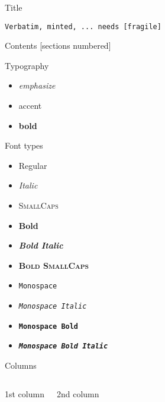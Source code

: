 
\begin{frame}[fragile]{Title}
    \begin{verbatim}Verbatim, minted, ... needs [fragile]\end{verbatim}
\end{frame}

\begin{frame}{Contents}
    [sections numbered]
    \tableofcontents[hideallsubsections]
\end{frame}

\begin{frame}{Typography}
    \begin{itemize}
        \item \emph{emphasize}
        \item \alert{accent}
        \item \textbf{bold}
    \end{itemize}
\end{frame}

\begin{frame}{Font types}
    \begin{itemize}
        \item Regular
        \item \textit{Italic}
        \item \textsc{SmallCaps}
        \item \textbf{Bold}
        \item \textbf{\textit{Bold Italic}}
        \item \textbf{\textsc{Bold SmallCaps}}
        \item \texttt{Monospace}
        \item \texttt{\textit{Monospace Italic}}
        \item \texttt{\textbf{Monospace Bold}}
        \item \texttt{\textbf{\textit{Monospace Bold Italic}}}
    \end{itemize}
\end{frame}

\begin{frame}{Columns}
    \begin{columns}[T,onlytextwidth]
        1st column

        2nd column
    \end{columns}
\end{frame}

